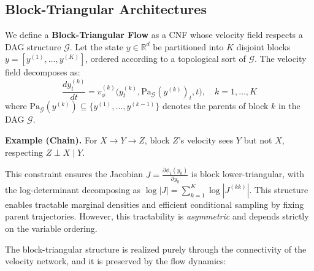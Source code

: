 \subsection{Block-Triangular Architectures}
\label{sec:block-triangular}

We define a \textbf{Block-Triangular Flow} as a CNF whose velocity field respects a DAG structure $\mathcal{G}$. Let the state $y \in \mathbb{R}^d$ be partitioned into $K$ disjoint blocks $y = [y^{(1)}, \dots, y^{(K)}]$, ordered according to a topological sort of $\mathcal{G}$. The velocity field decomposes as:
\begin{equation}
\frac{d y^{(k)}_t}{dt} = v^{(k)}_\phi\bigl(y^{(k)}_t, \mathrm{Pa}_\mathcal{G}(y^{(k)})_t, t\bigr), \quad k = 1, \dots, K
\end{equation}
where $\mathrm{Pa}_\mathcal{G}(y^{(k)}) \subseteq \{y^{(1)}, \dots, y^{(k-1)}\}$ denotes the parents of block $k$ in the DAG $\mathcal{G}$.

\textbf{Example (Chain).} For $X \to Y \to Z$, block $Z$'s velocity sees $Y$ but not $X$, respecting $Z \perp X \mid Y$.

This constraint ensures the Jacobian $J = \frac{\partial \phi_1(y_0)}{\partial y_0}$ is block lower-triangular, with the log-determinant decomposing as $\log|J| = \sum_{k=1}^K \log|J^{(kk)}|$. This structure enables tractable marginal densities and efficient conditional sampling by fixing parent trajectories. However, this tractability is \emph{asymmetric} and depends strictly on the variable ordering.

The block-triangular structure is realized purely through the connectivity of the velocity network, and it is preserved by the flow dynamics:

\begin{proposition}
\label{prop:structural-preservation}
\end{proposition}

